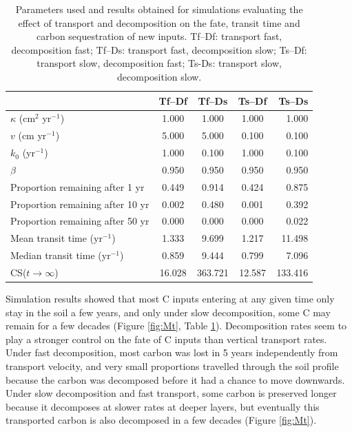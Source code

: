 \documentclass[11pt, oneside, a4paper]{article}   	%
\begin{document}
\begin{table}[h]
   \centering
   \caption{Parameters used and results obtained for simulations evaluating the effect of transport and decomposition on the fate, transit time and carbon sequestration of new inputs. Tf--Df: transport fast, decomposition fast; Tf--Ds: transport fast, decomposition slow; Ts--Df: transport slow, decomposition fast; Ts-Ds: transport slow, decomposition slow.}
   \begin{tabular}{@{} lcccr @{}} %
\toprule
 & Tf--Df & Tf--Ds & Ts--Df & Ts--Ds\\
\midrule
$\kappa$ (cm$^2$ yr$^{-1}$) & 1.000 & 1.000 & 1.000 & 1.000\\
$v$ (cm yr$^{-1}$) & 5.000 & 5.000 & 0.100 & 0.100\\
$k_0$ (yr$^{-1}$) & 1.000 & 0.100 & 1.000 & 0.100\\
$\beta$ & 0.950 & 0.950 & 0.950 & 0.950\\
Proportion remaining after 1 yr & 0.449   & 0.914 & 0.424  & 0.875\\
Proportion remaining after 10 yr & 0.002  & 0.480 & 0.001 &  0.392 \\
Proportion remaining after 50 yr & 0.000  & 0.000 & 0.000  & 0.022 \\
Mean transit time (yr$^{-1}$) & 1.333  & 9.699 & 1.217 & 11.498 \\
Median transit time (yr$^{-1}$) & 0.859  & 9.444 & 0.799  & 7.096 \\
CS($t \to \infty$) & 16.028 & 363.721 &12.587 &133.416 \\
\bottomrule
\end{tabular}
   \label{tab:simulationSetup}
\end{table}

Simulation results showed that most C inputs entering at any given time only stay in the soil a few years, and only under slow decomposition, some C may remain for a few decades (Figure \ref{fig:Mt}, Table \ref{tab:simulationSetup}). Decomposition rates seem to play a stronger control on the fate of C inputs than vertical transport rates. Under fast decomposition, most carbon was lost in 5 years independently from transport velocity, and very small proportions travelled through the soil profile because the carbon was decomposed before it had a chance to move downwards. Under slow decomposition and fast transport, some carbon is preserved longer because it decomposes at slower rates at deeper layers, but eventually this transported carbon is also decomposed in a few decades (Figure \ref{fig:Mt}).
\end{document}

